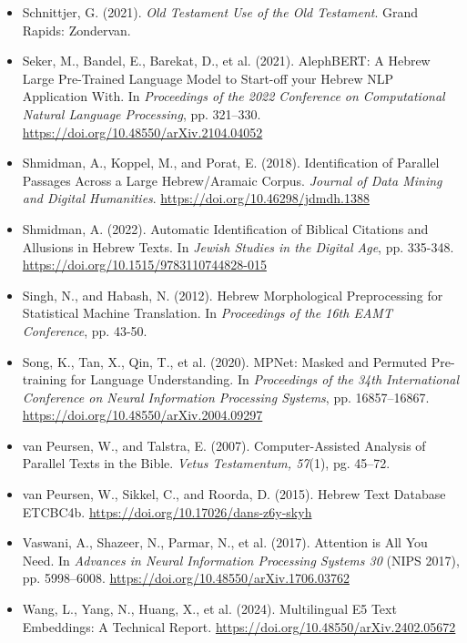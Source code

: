 \documentclass[12pt]{article}
\begin{document}
\begin{itemize}
    \item Schnittjer, G. (2021). \textit{Old Testament Use of the Old Testament}. Grand Rapids: Zondervan.
    \item Seker, M., Bandel, E., Barekat, D., et al. (2021). AlephBERT: A Hebrew Large Pre-Trained Language Model to Start-off your Hebrew NLP Application With. In \textit{Proceedings of the 2022 Conference on Computational Natural Language Processing}, pp. 321–330. \url{https://doi.org/10.48550/arXiv.2104.04052}
    \item Shmidman, A., Koppel, M., and Porat, E. (2018). Identification of Parallel Passages Across a Large Hebrew/Aramaic Corpus. \textit{Journal of Data Mining and Digital Humanities}. \url{https://doi.org/10.46298/jdmdh.1388}
    \item Shmidman, A. (2022). Automatic Identification of Biblical Citations and Allusions in Hebrew Texts. In \textit{Jewish Studies in the Digital Age}, pp. 335-348. \url{https://doi.org/10.1515/9783110744828-015}
    \item Singh, N., and Habash, N. (2012). Hebrew Morphological Preprocessing for Statistical Machine Translation. In \textit{Proceedings of the 16th EAMT Conference}, pp. 43-50.
    \item Song, K., Tan, X., Qin, T., et al. (2020). MPNet: Masked and Permuted Pre-training for Language Understanding. In \textit{Proceedings of the 34th International Conference on Neural Information Processing Systems}, pp. 16857–16867. \url{https://doi.org/10.48550/arXiv.2004.09297}
    \item van Peursen, W., and Talstra, E. (2007). Computer-Assisted Analysis of Parallel Texts in the Bible. \textit{Vetus Testamentum, 57}(1), pg. 45–72.
    \item van Peursen, W., Sikkel, C., and Roorda, D. (2015). Hebrew Text Database ETCBC4b. \url{https://doi.org/10.17026/dans-z6y-skyh}
    \item Vaswani, A., Shazeer, N., Parmar, N., et al. (2017). Attention is All You Need. In \textit{Advances in Neural Information Processing Systems 30} (NIPS 2017), pp. 5998–6008. \url{https://doi.org/10.48550/arXiv.1706.03762}
    \item Wang, L., Yang, N., Huang, X., et al. (2024). Multilingual E5 Text Embeddings: A Technical Report. \url{https://doi.org/10.48550/arXiv.2402.05672}
\end{itemize}
\end{document}
